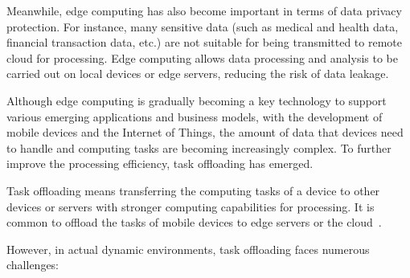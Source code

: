 \documentclass[journal]{IEEEtran}
\begin{document}
Meanwhile, edge computing has also become important in terms of data privacy protection. 
For instance, many sensitive data (such as medical and health data, financial transaction data, etc.) are not suitable 
for being transmitted to remote cloud for processing. 
Edge computing allows data processing and analysis to be carried out on local devices or edge servers, reducing the risk of data leakage.

Although edge computing is gradually becoming a key technology to support various emerging applications and business models, 
with the development of mobile devices and the Internet of Things, 
the amount of data that devices need to handle and computing tasks are becoming increasingly complex. 
To further improve the processing efficiency, task offloading has emerged.

Task offloading means transferring the computing tasks of a device to other devices or 
servers with stronger computing capabilities for processing. 
It is common to offload the tasks of mobile devices to edge servers or the cloud~\cite{zheng03}.

However, in actual dynamic environments, task offloading faces numerous challenges:
\end{document}
